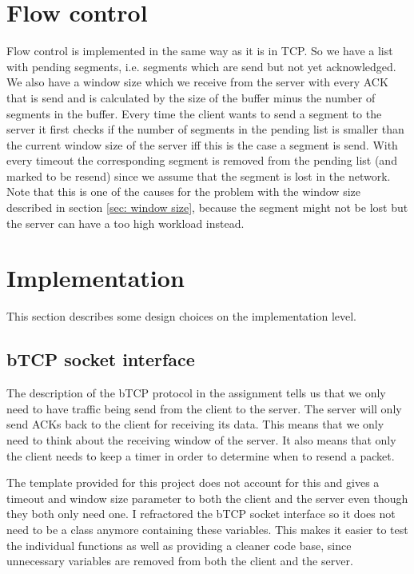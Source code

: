 \documentclass[a4paper]{article}
\begin{document}
\section{Flow control}
Flow control is implemented in the same way as it is in TCP. So we have a list with pending segments, i.e. segments which are send but not yet acknowledged. We also have a window size which we receive from the server with every ACK that is send and is calculated by the size of the buffer minus the number of segments in the buffer. Every time the client wants to send a segment to the server it first checks if the number of segments in the pending list is smaller than the current window size of the server iff this is the case a segment is send. With every timeout the corresponding segment is removed from the pending list (and marked to be resend) since we assume that the segment is lost in the network. Note that this is one of the causes for the problem with the window size described in section \ref{sec: window size}, because the segment might not be lost but the server can have a too high workload instead.

\section{Implementation}
This section describes some design choices on the implementation level.

	\subsection{bTCP socket interface}
	The description of the bTCP protocol in the assignment tells us that we only need to have traffic being send from the client to the server. The server will only send ACKs back to the client for receiving its data. This means that we only need to think about the receiving window of the server. It also means that only the client needs to keep a timer in order to determine when to resend a packet.

	The template provided for this project does not account for this and gives a timeout and window size parameter to both the client and the server even though they both only need one. I refractored the bTCP socket interface so it does not need to be a class anymore containing these variables. This makes it easier to test the individual functions as well as providing a cleaner code base, since unnecessary variables are removed from both the client and the server.
\end{document}
